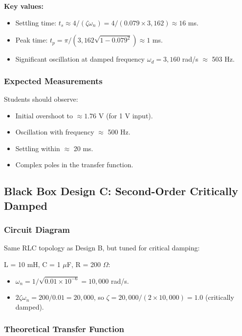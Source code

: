 \documentclass[11pt,letterpaper]{article}
\begin{document}
\noindent
\textbf{Key values:}
\begin{itemize}
    \item Settling time: $t_s \approx 4 / (\zeta \omega_n) = 4 / (0.079 \times 3,162) \approx 16$ ms.
    \item Peak time: $t_p = \pi / (3,162 \sqrt{1 - 0.079^2}) \approx 1$ ms.
    \item Significant oscillation at damped frequency $\omega_d = 3,160$ rad/s $\approx$ 503 Hz.
\end{itemize}

\subsubsection*{Expected Measurements}

Students should observe:
\begin{itemize}
    \item Initial overshoot to $\approx 1.76$ V (for 1 V input).
    \item Oscillation with frequency $\approx$ 500 Hz.
    \item Settling within $\approx$ 20 ms.
    \item Complex poles in the transfer function.
\end{itemize}

\subsection{Black Box Design C: Second-Order Critically Damped}

\subsubsection*{Circuit Diagram}

Same RLC topology as Design B, but tuned for critical damping:

\noindent
L = 10 mH, C = 1 $\mu$F, R = 200 $\Omega$:
\begin{itemize}
    \item $\omega_n = 1/\sqrt{0.01 \times 10^{-6}} = 10,000$ rad/s.
    \item $2\zeta \omega_n = 200 / 0.01 = 20,000$, so $\zeta = 20,000 / (2 \times 10,000) = 1.0$ (critically damped).
\end{itemize}

\subsubsection*{Theoretical Transfer Function}
\end{document}

